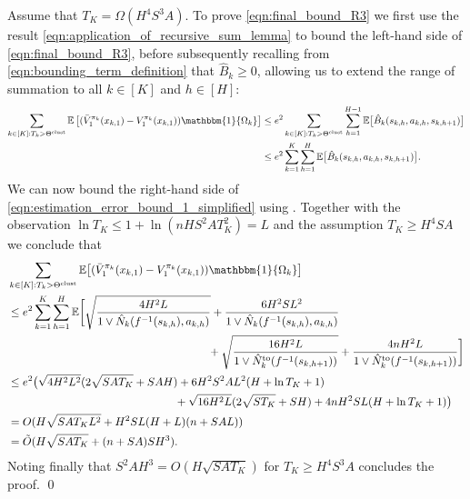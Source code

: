 \documentclass[11pt]{article}
\newcommand{\mbb}[1]{\mathbbm{#1}}
\newcommand{\mbbE}{\mathbb{E}}
\newcommand{\clust}{\textnormal{clust}}
\newcommand{\bkt}[1]{\left[#1\right]}
\theoremstyle{definition}
\theoremstyle{definition}
\begin{document}
Assume that $T_K = \Omega(H^4S^3A)$.
To prove \eqref{eqn:final_bound_R3} we first use the result \eqref{eqn:application_of_recursive_sum_lemma} to bound the left-hand side of \eqref{eqn:final_bound_R3}, before subsequently recalling from \eqref{eqn:bounding_term_definition} that $\hat{B}_k\geq 0$, allowing us to extend the range of summation to all $k\in[K]$ and $h\in[H]$:
\begin{align}
	\sum_{k\in[K]:T_k>\Theta^{\clust}}
	\mbbE\bkt{(\bar{V}^{\pi_k}_{1}(x_{k,1})-V_1^{\pi_k}(x_{k,1}))\mbb{1}\{\Omega_k\}}
	 &
	\leq
	e^2\sum_{k\in[K]:T_k>\Theta^{\clust}}\sum_{h=1}^{H-1}\mbbE\bigl[
	\hat{B}_k(s_{k,h},a_{k,h},s_{k,h+1})
	\bigr]
	\nonumber
	\\
	 &
	\leq
	e^2\sum_{k=1}^K\sum_{h=1}^H\mbbE\bigl[
	\hat{B}_k(s_{k,h},a_{k,h},s_{k,h+1})
	\bigr]
	.
	\label{eqn:estimation_error_bound_1_simplified}
\end{align}
We can now bound the right-hand side of \eqref{eqn:estimation_error_bound_1_simplified} using .
Together with the observation $\ln T_K\leq 1+\ln(nHS^2AT_K^2)=L$ and the assumption $T_K\geq H^4SA$ we conclude that
\begin{align}
	&
	\sum_{k\in[K]:T_k>\Theta^{\clust}}
	\mbbE\bigl[
		(\bar{V}^{\pi_k}_{1}(x_{k,1})-V_1^{\pi_k}(x_{k,1}))\mbb{1}\{\Omega_k\}
	\bigr]
	\nonumber
	\\
	&
	\leq
	e^2
	\sum_{k=1}^K\sum_{h=1}^H
	\mbbE\biggl[
		\sqrt{\frac{4H^2 L}{1\vee \hat{N}_k(f^{-1}(s_{k,h}),a_{k,h})}}
		+
		\frac{6H^2SL^2}{1\vee \hat{N}_k(f^{-1}(s_{k,h}),a_{k,h})}
		\nonumber
		\\
		&
		\phantom{
			\leq e^2\sum_{k=1}^K\sum_{h=1}^H\mbbE\biggl[
			\sqrt{\frac{4H^2 L}{1\vee \hat{N}_k(f^{-1}(s_{k,h}),a_{k,h})}}
		}
		+
		\sqrt{\frac{16H^2 L}{1\vee \hat{N}^{\mathrm{to}}_k(f^{-1}(s_{k,h+1}))}}
		+
		\frac{4nH^2L}{1\vee \hat{N}^{\mathrm{to}}_k(f^{-1}(s_{k,h+1}))}
	\biggr]
	\nonumber
	\\
	&
	\leq
	e^2\bigl(
		\sqrt{4H^2L^2}(2\sqrt{SAT_K}+SAH)
		+
		6H^2S^2AL^2(H+\ln T_K + 1)
		\nonumber
		\\
		&
		\phantom{
			\leq e^2\bigl(
			\sqrt{4H^2L^2}(2\sqrt{SAT_K}+SAH)
		}
		+
		\sqrt{16H^2L}(2\sqrt{ST_K}+SH)
		+
		4nH^2SL(H+\ln T_K+1)
	\bigr)
	\nonumber
	\\
	&
	=
	O(
	H\sqrt{SAT_KL^2}
	+
	H^2SL(H+L)(n+SAL)
	)
	\nonumber
	\\
	&
	=
	\tilde{O}(
	H\sqrt{SAT_K}
	+
	(n+SA)SH^3
	)
	.
\end{align}
Noting finally that $S^2AH^3=O(H\sqrt{SAT_K})$ for $T_K\geq H^4S^3A$ concludes the proof.
\qed
\end{document}
